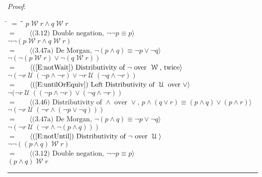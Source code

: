 \documentclass[12pt, fleqn, leqno]{article}
\newcommand{\lgap}{2pt}                             %
\newcommand{\mymathindent}{24pt}                    %
\newcommand{\Until}{\;\mathcal{U}\;}
\newcommand{\Wait}{\;\mathcal{W}\;}
\newcommand{\Always}{\Box\,}
\newcommand{\myqed}{\rule[-.23ex]{1.2ex}{2.0ex}}
\newcommand{\myqedtab}{\hspace{384pt}}              %
\newcommand{\Gll} {\langle}                         %
\newcommand{\Ggg} {\rangle}                         %
\newcommand{\Hint}[1]     {\ \ \ $\Gll              \mbox{#1} \Ggg$ }   %
\begin{document}
\emph{Proof}:
\begin{tabbing}
\hspace{\mymathindent} \= $= \;$ \= \myqedtab \= \kill
\> \>$p \Wait r \land q \Wait r$\\[\lgap]
\> $=$ \> \Hint{(3.12) Double negation, $\neg\neg p\equiv p$} \\[\lgap]
\> \>$\neg\neg(p \Wait r \land q \Wait r)$\\[\lgap]
\> $=$ \> \Hint{(3.47a) De Morgan, $\neg (p\land q)\equiv \neg p\lor \neg q$} \\[\lgap]
\> \>$\neg(\neg(p \Wait r) \lor \neg(q \Wait r))$\\[\lgap]
\> $=$ \> \Hint{(\ref{E:notWait}) Distributivity of $\neg$ over $\Wait$, twice} \\[\lgap]
\> \>$\neg(\neg r \Until (\neg p \land \neg r) \lor \neg r \Until (\neg q \land \neg r))$\\[\lgap]
\> $=$ \> \Hint{(\ref{E:untilOrEquiv}) Left Distributivity of $\Until$ over $\lor$} \\[\lgap]
\> \>$\neg(\neg r \Until ((\neg p \land \neg r)\lor (\neg q \land \neg r))$\\[\lgap]
\> $=$  \>  \Hint{(3.46) Distributivity of $\land$ over $\lor$, $p\land (q\lor r)\equiv (p\land q)\lor (p\land r)$}\\[\lgap]
\> \>$\neg(\neg r \Until (\neg r\land(\neg p\lor \neg q)))$\\[\lgap]
\> $=$ \> \Hint{(3.47a) De Morgan, $\neg (p\land q)\equiv \neg p\lor \neg q$} \\[\lgap]
\> \>$\neg(\neg r \Until (\neg r\land\neg (p\land q)))$\\[\lgap]
\> $=$ \> \Hint{(\ref{E:notUntil}) Distributivity of $\neg$ over $\Until$} \\[\lgap]
\> \>$\neg\neg((p\land q)\Wait r)$\\[\lgap]
\> $=$ \> \Hint{(3.12) Double negation, $\neg\neg p\equiv p$} \\[\lgap]
\> \>$(p\land q)\Wait r$ \quad \myqed
\end{tabbing}
\end{document}
